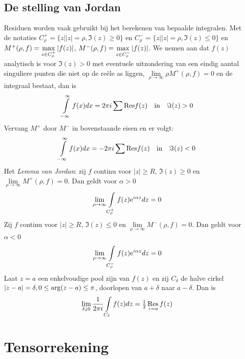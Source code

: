 \documentclass[twoside]{report}
\begin{document}
\section{De stelling van Jordan}
Residuen worden vaak gebruikt bij het berekenen van bepaalde integralen. Met de
notaties $C_\rho^+=\{z||z|=\rho,\Im(z)\geq0\}$ en $C_\rho^-=\{z||z|=\rho,\Im(z)\leq0\}$
en $M^+(\rho,f)=\mathop{\rm max}\limits_{z\in C_\rho^+}|f(z)|$,
$M^-(\rho,f)=\mathop{\rm max}\limits_{z\in C_\rho^-}|f(z)|$. We nemen aan dat
$f(z)$ analytisch is voor $\Im(z)>0$ met eventuele uitzondering van een eindig
aantal singuliere punten die niet op de re\"ele as liggen,
$\lim\limits_{\rho\rightarrow\infty}\rho M^+(\rho,f)=0$ en de integraal bestaat,
dan is
\[
\int\limits_{-\infty}^\infty f(x)dx=2\pi i\sum{\rm Res}f(z)~~~\mbox{in}~~~\Im(z)>0
\]
Vervang $M^+$ door $M^-$ in bovenstaande eisen en er volgt:
\[
\int\limits_{-\infty}^\infty f(x)dx=-2\pi i\sum{\rm Res}f(z)~~~\mbox{in}~~~\Im(z)<0
\]
Het {\it Lemma van Jordan}: zij $f$ continu voor $|z|\geq R$, $\Im(z)\geq0$ en
$\lim\limits_{\rho\rightarrow\infty}M^+(\rho,f)=0$. Dan geldt voor $\alpha>0$
\[
\lim_{\rho\rightarrow\infty}\int\limits_{C_\rho^+}f(z){\rm e}^{i\alpha z}dz=0
\]
Zij $f$ continu voor $|z|\geq R$, $\Im(z)\leq0$ en
$\lim\limits_{\rho\rightarrow\infty}M^-(\rho,f)=0$. Dan geldt voor $\alpha<0$
\[
\lim_{\rho\rightarrow\infty}\int\limits_{C_\rho^-}f(z){\rm e}^{i\alpha z}dz=0
\]
Laat $z=a$ een enkelvoudige pool zijn van $f(z)$ en zij $C_\delta$ de halve
cirkel $|z-a|=\delta,0\leq{\rm arg}(z-a)\leq\pi$, doorlopen van $a+\delta$ naar
$a-\delta$. Dan is
\[
\lim_{\delta\downarrow0}\frac{1}{2\pi i}\int\limits_{C_\delta}f(z)dz=\mbox{$\frac{1}{2}$}\mathop{\rm Res}\limits_{z=a}f(z)
\]


\chapter{Tensorrekening}
\end{document}
